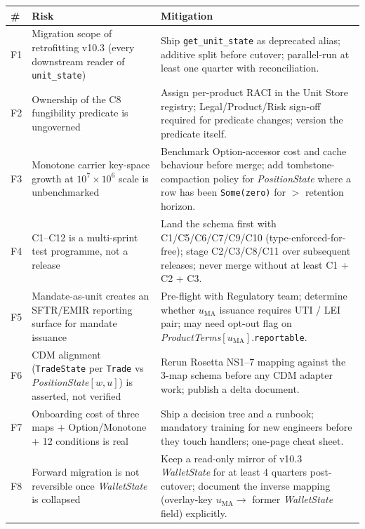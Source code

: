 \documentclass[11pt,a4paper]{article}
\begin{document}
\begin{longtable}{p{0.7cm}p{6.5cm}p{7.5cm}}
\toprule
\textbf{\#} & \textbf{Risk} & \textbf{Mitigation} \\
\midrule
F1 & Migration scope of retrofitting v10.3 (every downstream reader of \texttt{unit\_state}) & Ship \texttt{get\_unit\_state} as deprecated alias; additive split before cutover; parallel-run at least one quarter with reconciliation. \\
\addlinespace
F2 & Ownership of the C8 fungibility predicate is ungoverned & Assign per-product RACI in the Unit Store registry; Legal/Product/Risk sign-off required for predicate changes; version the predicate itself. \\
\addlinespace
F3 & Monotone carrier key-space growth at $10^7 \times 10^6$ scale is unbenchmarked & Benchmark Option-accessor cost and cache behaviour before merge; add tombstone-compaction policy for \textit{PositionState} where a row has been \texttt{Some(zero)} for $>$ retention horizon. \\
\addlinespace
F4 & C1--C12 is a multi-sprint test programme, not a release & Land the schema first with C1/C5/C6/C7/C9/C10 (type-enforced-for-free); stage C2/C3/C8/C11 over subsequent releases; never merge without at least C1 + C2 + C3. \\
\addlinespace
F5 & Mandate-as-unit creates an SFTR/EMIR reporting surface for mandate issuance & Pre-flight with Regulatory team; determine whether $u_{\mathrm{MA}}$ issuance requires UTI / LEI pair; may need opt-out flag on \textit{ProductTerms}$[u_{\mathrm{MA}}]$.\texttt{reportable}. \\
\addlinespace
F6 & CDM alignment (\texttt{TradeState} per \texttt{Trade} vs \textit{PositionState}$[w, u]$) is asserted, not verified & Rerun Rosetta NS1--7 mapping against the 3-map schema before any CDM adapter work; publish a delta document. \\
\addlinespace
F7 & Onboarding cost of three maps + Option/Monotone + 12 conditions is real & Ship a decision tree and a runbook; mandatory training for new engineers before they touch handlers; one-page cheat sheet. \\
\addlinespace
F8 & Forward migration is not reversible once \textit{WalletState} is collapsed & Keep a read-only mirror of v10.3 \textit{WalletState} for at least 4 quarters post-cutover; document the inverse mapping (overlay-key $u_{\mathrm{MA}} \to$ former \textit{WalletState} field) explicitly. \\
\bottomrule
\end{longtable}
\end{document}
